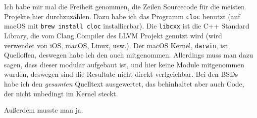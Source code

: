 \documentclass[ngerman,abstract=true]{scrartcl}
\begin{document}
\begin{anmerkung}
Ich habe mir mal die Freiheit genommen, die Zeilen Sourcecode für die meisten Projekte hier durchzuzählen. Dazu habe ich das Programm \verb|cloc| benutzt (auf macOS mit \verb|brew install cloc| installierbar). Die \verb|libcxx| ist die C++ Standard Library, die vom Clang Compiler des LLVM Projekt genutzt wird (wird verwendet von iOS, macOS, Linux, usw.). Der macOS Kernel, \verb|darwin|, ist Quelloffen, deswegen habe ich den auch mitgenommen. Allerdings muss man dazu sagen, dass dieser modular aufgebaut ist, und hier keine Module mitgenommen wurden, deswegen sind die Resultate nicht direkt verlgeichbar. Bei den BSDs habe ich den \emph{gesamten} Quelltext ausgewertet, das behinhaltet aber auch Code, der nicht unbedingt im Kernel steckt.
\end{anmerkung}


Außerdem musste man ja.
\end{document}
